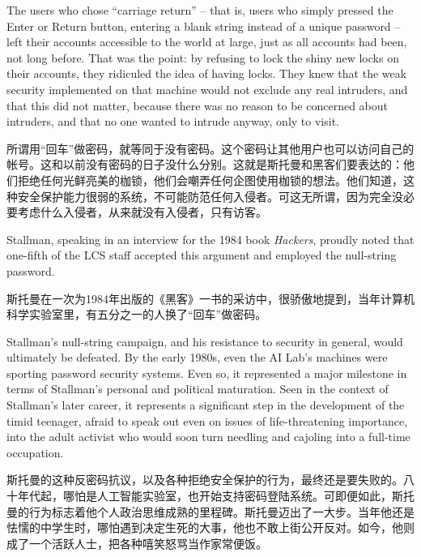 \ifdefined\eng
The users who chose ``carriage return'' -- that is, users who simply pressed the Enter or Return button, entering a blank string instead of a unique password -- left their accounts accessible to the world at large, just as all accounts had been, not long before. That was the point: by refusing to lock the shiny new locks on their accounts, they ridiculed the idea of having locks. They knew that the weak security implemented on that machine would not exclude any real intruders, and that this did not matter, because there was no reason to be concerned about intruders, and that no one wanted to intrude anyway, only to visit.
\fi

\ifdefined\chs
所谓用``回车''做密码，就等同于没有密码。这个密码让其他用户也可以访问自己的帐号。这和以前没有密码的日子没什么分别。这就是斯托曼和黑客们要表达的：他们拒绝任何光鲜亮美的枷锁，他们会嘲弄任何企图使用枷锁的想法。他们知道，这种安全保护能力很弱的系统，不可能防范任何入侵者。可这无所谓，因为完全没必要考虑什么入侵者，从来就没有入侵者，只有访客。
\fi

\ifdefined\eng
Stallman, speaking in an interview for the 1984 book \textit{Hackers}, proudly noted that one-fifth of the LCS staff accepted this argument and employed the null-string password.
\fi

\ifdefined\chs
斯托曼在一次为1984年出版的《黑客》一书的采访中，很骄傲地提到，当年计算机科学实验室里，有五分之一的人换了``回车''做密码。
\fi

\ifdefined\eng
Stallman's null-string campaign, and his resistance to security in general, would ultimately be defeated. By the early 1980s, even the AI Lab's machines were sporting password security systems. Even so, it represented a major milestone in terms of Stallman's personal and political maturation. Seen in the context of Stallman's later career, it represents a significant step in the development of the timid teenager, afraid to speak out even on issues of life-threatening importance, into the adult activist who would soon turn needling and cajoling into a full-time occupation.
\fi

\ifdefined\chs
斯托曼的这种反密码抗议，以及各种拒绝安全保护的行为，最终还是要失败的。八十年代起，哪怕是人工智能实验室，也开始支持密码登陆系统。可即便如此，斯托曼的行为标志着他个人政治思维成熟的里程碑。斯托曼迈出了一大步。当年他还是怯懦的中学生时，哪怕遇到决定生死的大事，他也不敢上街公开反对。如今，他则成了一个活跃人士，把各种嘻笑怒骂当作家常便饭。
\fi

